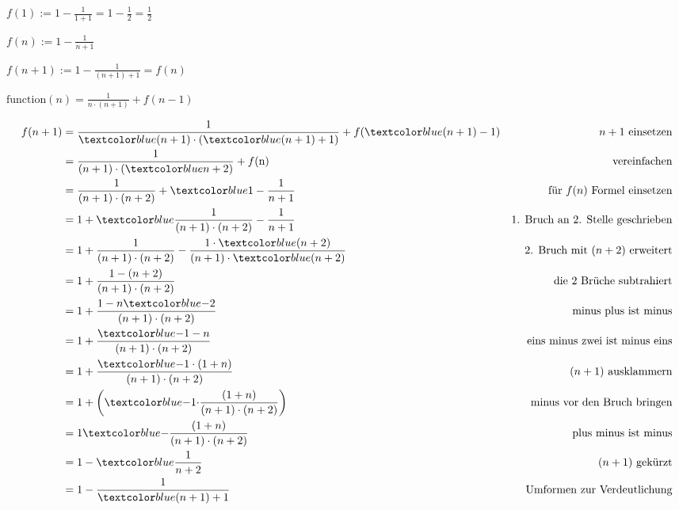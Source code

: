 \documentclass{lehramt-informatik-aufgabe}
\begin{document}
\begin{liAntwort}
\liInduktionAnfang

$f(1) := 1 - \frac{1}{1 + 1} = 1 - \frac{1}{2} = \frac{1}{2}$

\liInduktionVoraussetzung

$f(n) := 1 - \frac{1}{n + 1}$

\liInduktionSchritt


$f(n + 1) := 1 - \frac{1}{(n + 1) + 1} = f(n)$


$\text{function}(n) = \frac{1}{n \cdot (n + 1)} + f(n - 1)$

\begin{align*}
f(n + 1)
& = \frac{1}{\m{(n + 1)} \cdot
    (\m{(n + 1) }+ 1)} +
    f(\m{(n + 1)} - 1)
& n + 1 \text{ einsetzen}\\
%
& = \frac{1}{(n + 1) \cdot
    (\m{n + 2})} + f(\text{n})
& \text{ vereinfachen}\\
%
& = \frac{1}{(n + 1) \cdot (n + 2)} +
    \m{1 - \frac{1}{n + 1}}
& \text{für } f(n) \text{ Formel einsetzen}\\
%
& = 1 +
    \m{\frac{1}{(n + 1) \cdot (n + 2)}} -
    \frac{1}{n + 1}
& \text{1. Bruch an 2. Stelle geschrieben}\\
%
& = 1 +
    \frac{1}{(n + 1) \cdot (n + 2)} -
    \frac{1 \cdot \m{(n + 2)}}{(n + 1) \cdot \m{(n + 2)}}
& \text{2. Bruch mit }(n + 2) \text{ erweitert}\\
%
& = 1 +
    \frac{1 - (n + 2)}{(n + 1) \cdot (n + 2)}
& \text{die 2 Brüche subtrahiert}\\
%
& = 1 +
    \frac{1 - n \m{-} 2}{(n + 1) \cdot (n + 2)}
& \text{minus plus ist minus}\\
%
& = 1 +
    \frac{\m{-1} - n}{(n + 1) \cdot (n + 2)}
& \text{eins minus zwei ist minus eins}\\
%
& = 1 +
    \frac{\m{-1 \cdot (1 + n)}}{(n + 1) \cdot (n + 2)}
& (n + 1) \text{ ausklammern}\\
%
& = 1 +
    \left(\m{-1 \cdot} \frac{(1 + n)}{(n + 1) \cdot (n + 2)}\right)
& \text{minus vor den Bruch bringen}\\
%
& = 1 \m{-}
    \frac{(1 + n)}{(n + 1) \cdot (n + 2)}
& \text{plus minus ist minus}\\
%
& = 1 -
    \m{\frac{1}{n + 2}}
& (n + 1) \text{ gekürzt}\\
%
& = 1 -
    \frac{1}{\m{(n + 1)} + 1}
& \text{Umformen zur Verdeutlichung}\\
\end{align*}
\end{liAntwort}
\end{document}
